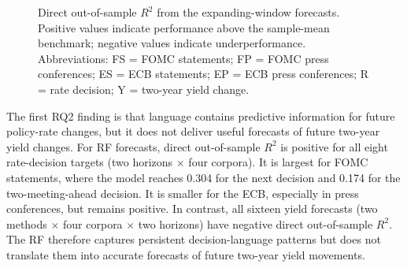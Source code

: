 \begin{figure}[H]
  \centering
  \caption[RQ2 direct expanding-window forecast performance]{Direct
    out-of-sample $R^2$ from the expanding-window forecasts. Positive values
    indicate performance above the sample-mean benchmark; negative values
    indicate underperformance. Abbreviations: FS = FOMC statements; FP = FOMC
    press conferences; ES = ECB statements; EP = ECB press conferences; R =
    rate decision; Y = two-year yield change.}
  \label{fig:rq2_direct_oos_r2_v31}
\end{figure}

The first RQ2 finding is that language contains predictive information for
future policy-rate changes, but it does not deliver useful forecasts of future
two-year yield changes. For RF forecasts, direct out-of-sample $R^2$ is
positive for all eight rate-decision targets (two horizons $\times$ four
corpora). It is largest for FOMC statements, where the model reaches 0.304 for
the next decision and 0.174 for the two-meeting-ahead decision. It is smaller
for the ECB, especially in press conferences, but remains positive. In
contrast, all sixteen yield forecasts (two methods $\times$ four corpora
$\times$ two horizons) have negative direct out-of-sample $R^2$. The RF
therefore captures persistent decision-language patterns but does not translate
them into accurate forecasts of future two-year yield movements.

